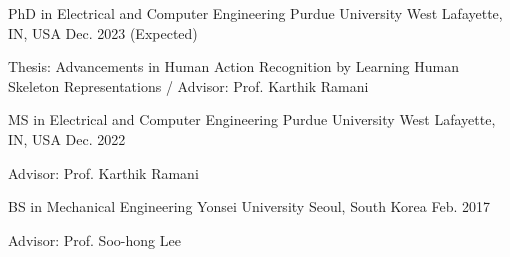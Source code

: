 


\begin{cventries}


    \cventry
    {PhD in Electrical and Computer Engineering} %
    {Purdue University} %
    {West Lafayette, IN, USA} %
    {Dec. 2023 (Expected)} %
    { %
    \begin{cvitems}
        \item {Thesis: Advancements in Human Action Recognition by Learning Human Skeleton Representations / Advisor: Prof. Karthik Ramani}
    \end{cvitems}
    }

    \cventry
    {MS in Electrical and Computer Engineering} %
    {Purdue University} %
    {West Lafayette, IN, USA} %
    {Dec. 2022} %
    { %
    \begin{cvitems}
        \item {Advisor: Prof. Karthik Ramani}
    \end{cvitems}
    }

    \cventry
    {BS in Mechanical Engineering} %
    {Yonsei University} %
    {Seoul, South Korea} %
    {Feb. 2017} %
    { %
    \begin{cvitems}
        \item {Advisor: Prof. Soo-hong Lee}
    \end{cvitems}
    }

\end{cventries}
